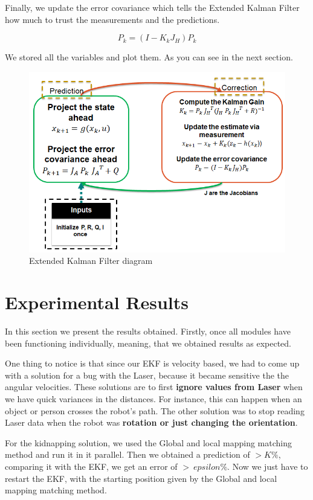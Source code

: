 \documentclass[a4paper]{IEEEtran}
\begin{document}
Finally, we update the error covariance which tells the Extended Kalman Filter how much to trust the measurements and the predictions.

\begin{equation}
P_{k}=(I-K_{k}{J^{}_H})P_{k}
\end{equation}

We stored all the variables and plot them. As you can see in the next section.
\\

\begin{figure}[t!]
    \centering
    \includegraphics[scale=0.33]{ekf}
    \caption{Extended Kalman Filter diagram}
\end{figure}


\section{Experimental Results}
\label{sec:experimental-results}

In this section we present the results obtained. Firstly, once all modules have been functioning individually, meaning, that we obtained results as expected.\par
One thing to notice is that since our EKF is velocity based, we had to come up with a solution for a bug with the Laser, because it became sensitive the the angular velocities. These solutions are to first \textbf{ignore values from Laser} when we have quick variances in the distances. For instance, this can happen when an object or person crosses the robot's path. The other solution was to stop reading Laser data when the robot was \textbf{rotation or just changing the orientation}. \par
For the kidnapping solution, we used the Global and local mapping matching method and run it in it parallel. Then we obtained a prediction of $> K \% $, comparing it with the EKF, we get an error of $> \ epsilon \% $. Now we just have to restart the EKF, with the starting position given by the Global and local mapping matching method.\\
\end{document}
